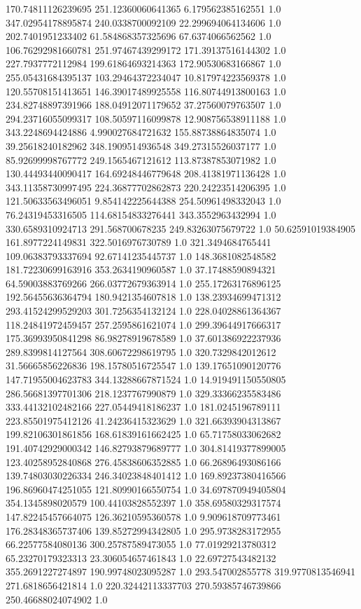 170.74811126239695	251.12360060641365	6.179562385162551	1.0
347.02954178895874	240.0338700092109	22.299694064134606	1.0
202.7401951233402	61.584868357325696	67.6374066562562	1.0
106.76292981660781	251.97467439299172	171.39137516144302	1.0
227.7937772112984	199.61864693214363	172.90530683166867	1.0
255.05431684395137	103.29464372234047	10.817974223569378	1.0
120.55708151413651	146.39017489925558	116.80744913800163	1.0
234.82748897391966	188.04912071179652	37.27560079763507	1.0
294.23716055099317	108.50597116099878	12.908756538911188	1.0
343.2248694424886	4.990027684721632	155.88738864835074	1.0
39.25618240182962	348.1909514936548	349.27315526037177	1.0
85.92699998767772	249.1565467121612	113.87387853071982	1.0
130.44493440090417	164.69248446779648	208.41381971136428	1.0
343.11358730997495	224.36877702862873	220.24223514206395	1.0
121.50633563496051	9.854142225644388	254.50961498332043	1.0
76.24319453316505	114.68154833276441	343.3552963432994	1.0
330.6589310924713	291.568700678235	249.83263075679722	1.0
50.62591019384905	161.8977224149831	322.5016976730789	1.0
321.3494684765441	109.06383793337694	92.67141235445737	1.0
148.3681082548582	181.72230699163916	353.2634190960587	1.0
37.17488590894321	64.59003883769266	266.03772679363914	1.0
255.17263176896125	192.56455636364794	180.9421354607818	1.0
138.23934699471312	293.41524299529203	301.7256354132124	1.0
228.04028861364367	118.24841972459457	257.2595861621074	1.0
299.39644917666317	175.36993950841298	86.98278919678589	1.0
37.601386922237936	289.8399814127564	308.60672298619795	1.0
320.7329842012612	31.56665856226836	198.15780516725547	1.0
139.17651090120776	147.71955004623783	344.13288667871524	1.0
14.919491150550805	286.56681397701306	218.1237767990879	1.0
329.33366235583486	333.44132102482166	227.05449418186237	1.0
181.0245196789111	223.85501975412126	41.24236415323629	1.0
321.66393904313867	199.82106301861856	168.61839161662425	1.0
65.71758033062682	191.40742929000342	146.82793879689777	1.0
304.81419377899005	123.40258952840868	276.45838606352885	1.0
66.26896493086166	139.74803030226334	246.34023848401412	1.0
169.89237380416566	196.86960474251055	121.80990166550754	1.0
34.697870949405804	354.1345898020579	100.44103828552397	1.0
358.69580329317574	147.82245457664075	126.36210595360578	1.0
9.909618709773461	176.28348365737406	139.85272994342805	1.0
295.9738283172955	66.22577584080136	300.25787589473055	1.0
77.01929213780312	65.23270179323313	23.306054657461843	1.0
22.69727543482132	355.2691227274897	190.99748023095287	1.0
293.547002855778	319.9770813546941	271.6818656421814	1.0
220.32442113337703	270.59385746739866	250.46688024074902	1.0
